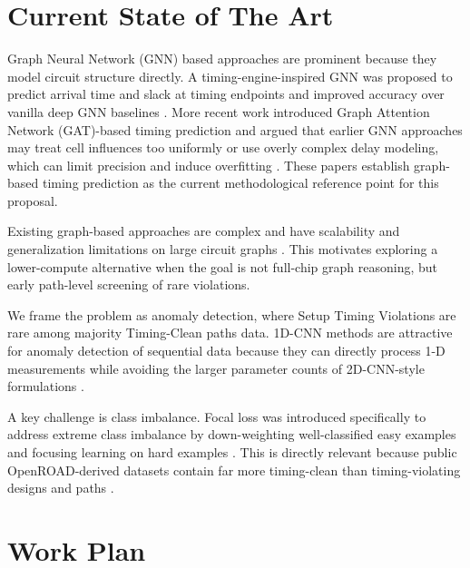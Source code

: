 \documentclass[12pt,a4paper]{article}
\begin{document}
\section{Current State of The Art}


Graph Neural Network (GNN) based approaches are prominent because they model circuit structure directly. A timing-engine-inspired GNN was proposed to predict arrival time and slack at timing endpoints and improved accuracy over vanilla deep GNN baselines \cite{Guo2022A}. More recent work introduced Graph Attention Network (GAT)-based timing prediction and argued that earlier GNN approaches may treat cell influences too uniformly or use overly complex delay modeling, which can limit precision and induce overfitting \cite{Li2025Pre-Routing}. These papers establish graph-based timing prediction as the current methodological reference point for this proposal.

Existing graph-based approaches are complex and have scalability and generalization limitations on large circuit graphs \cite{Li2025Pre-Routing}. This motivates exploring a lower-compute alternative when the goal is not full-chip graph reasoning, but early path-level screening of rare violations.

We frame the problem as anomaly detection, where Setup Timing Violations are rare among majority Timing-Clean paths data. 1D-CNN methods are attractive for anomaly detection of sequential data because they can directly process 1-D measurements while avoiding the larger parameter counts of 2D-CNN-style formulations \cite{Gong2022A}.

A key challenge is class imbalance. Focal loss was introduced specifically to address extreme class imbalance by down-weighting well-classified easy examples and focusing learning on hard examples \cite{Lin2017Focal}. This is directly relevant because public OpenROAD-derived datasets contain far more timing-clean than timing-violating designs and paths \cite{Shrestha2026EDA-Schema-V2:}.

\section{Work Plan}

\end{document}
